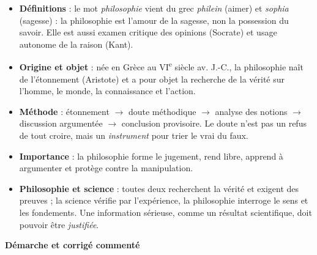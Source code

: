 \documentclass[11pt]{article}
\newcommand{\cle}[1]{{\popxbold\color{popdark}#1}}
\begin{document}
\begin{aretenir}
\begin{itemize}
\item \textbf{Définitions} : le mot \emph{philosophie} vient du grec \emph{philein} (aimer) et \emph{sophia} (sagesse) : la philosophie est l'\cle{amour de la sagesse}, non la possession du savoir. Elle est aussi \cle{examen critique} des opinions (Socrate) et usage autonome de la raison (Kant).
\item \textbf{Origine et objet} : née en Grèce au VI\textsuperscript{e} siècle av. J.-C., la philosophie naît de l'\cle{étonnement} (Aristote) et a pour objet la recherche de la \cle{vérité} sur l'homme, le monde, la connaissance et l'action.
\item \textbf{Méthode} : étonnement $\rightarrow$ doute méthodique $\rightarrow$ analyse des notions $\rightarrow$ discussion argumentée $\rightarrow$ conclusion provisoire. Le doute n'est pas un refus de tout croire, mais un \emph{instrument} pour trier le vrai du faux.
\item \textbf{Importance} : la philosophie forme le jugement, rend libre, apprend à argumenter et protège contre la manipulation.
\item \textbf{Philosophie et science} : toutes deux recherchent la vérité et exigent des preuves ; la science vérifie par l'expérience, la philosophie interroge le sens et les fondements. Une information sérieuse, comme un résultat scientifique, doit pouvoir être \emph{justifiée}.
\end{itemize}
\end{aretenir}

\textbf{Démarche et corrigé commenté}\par
\end{document}
